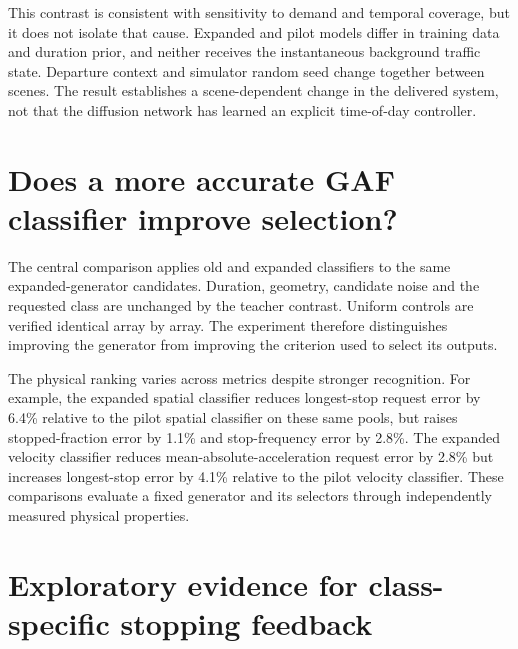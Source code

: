 This contrast is consistent with sensitivity to demand and temporal coverage, but it does not isolate that cause. Expanded and pilot models differ in training data and duration prior, and neither receives the instantaneous background traffic state. Departure context and simulator random seed change together between scenes. The result establishes a scene-dependent change in the delivered system, not that the diffusion network has learned an explicit time-of-day controller.

\FloatBarrier

\FloatBarrier
\section{Does a more accurate GAF classifier improve selection?}
\label{sec:corpus-teacher-supplement}

The central comparison applies old and expanded classifiers to the same expanded-generator candidates. Duration, geometry, candidate noise and the requested class are unchanged by the teacher contrast. Uniform controls are verified identical array by array. The experiment therefore distinguishes improving the generator from improving the criterion used to select its outputs.


The physical ranking varies across metrics despite stronger recognition. For example, the expanded spatial classifier reduces longest-stop request error by 6.4\% relative to the pilot spatial classifier on these same pools, but raises stopped-fraction error by 1.1\% and stop-frequency error by 2.8\%. The expanded velocity classifier reduces mean-absolute-acceleration request error by 2.8\% but increases longest-stop error by 4.1\% relative to the pilot velocity classifier. These comparisons evaluate a fixed generator and its selectors through independently measured physical properties.


\FloatBarrier
\section{Exploratory evidence for class-specific stopping feedback}
\label{sec:exploratory-stopping-supplement}

